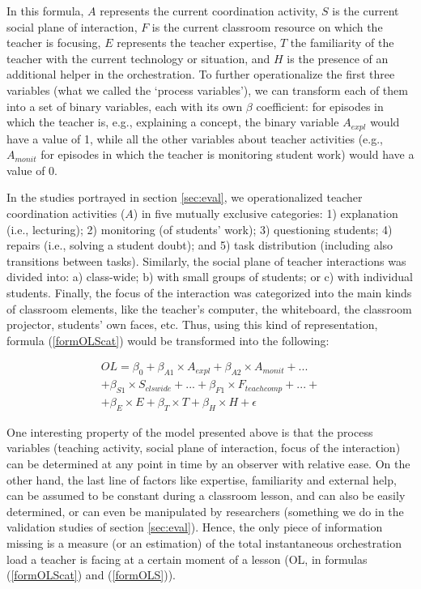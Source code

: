 \documentclass[10pt,journal,compsoc]{IEEEtran}
\begin{document}
In this formula, $A$ represents the current coordination activity, $S$ is the current social plane of interaction, $F$ is the current classroom resource on which the teacher is focusing, $E$ represents the teacher expertise, $T$ the familiarity of the teacher with the current technology or situation, and $H$ is the presence of an additional helper in the orchestration. To further operationalize the first three variables (what we called the `process variables'), we can transform each of them into a set of binary variables, each with its own $\beta$ coefficient: for episodes in which the teacher is, e.g., explaining a concept, the binary variable $A_{expl}$ would have a value of 1, while all the other variables about teacher activities (e.g., $A_{monit}$ for episodes in which the teacher is monitoring student work) would have a value of 0. 

In the studies portrayed in section \ref{sec:eval}, we operationalized teacher coordination activities ($A$) in five mutually exclusive categories: 1) explanation (i.e., lecturing); 2) monitoring (of students' work); 3) questioning students; 4) repairs (i.e., solving a student doubt); and  5) task  distribution (including also transitions between tasks). Similarly, the social plane of teacher interactions was divided into: a) class-wide; b) with small groups of students; or c) with individual students. Finally, the focus of the interaction was categorized into the main kinds of classroom elements, like the teacher's computer, the whiteboard, the classroom projector, students' own faces, etc. Thus, using this kind of representation, formula (\ref{formOLScat}) would be transformed into the following:

\begin{multline}
\label{formOLS}
OL = \beta_0 + \beta_{A1}\times{}A_{expl} + \beta_{A2}\times{}A_{monit} + ... \\ + \beta_{S1}\times{}S_{clswide} + ... + \beta_{F1}\times{}F_{teachcomp} + ... + \\ + \beta_E\times{}E + \beta_T\times{}T + \beta_H\times{}H + \epsilon
\end{multline}

One interesting property of the model presented above is that the process variables (teaching activity, social plane of interaction, focus of the interaction) can be determined at any point in time by an observer with relative ease. On the other hand, the last line of factors like expertise, familiarity and external help, can be assumed to be constant during a classroom lesson, and can also be easily determined, or can even be manipulated by researchers (something we do in the validation studies of section \ref{sec:eval}). Hence, the only piece of information missing is a measure (or an estimation) of the total instantaneous orchestration load a teacher is facing at a certain moment of a lesson (OL, in formulas (\ref{formOLScat}) and (\ref{formOLS})).
\end{document}
